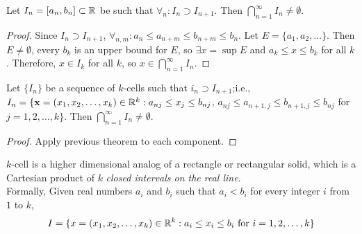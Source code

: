 \begin{thm}[38]
	Let $I_n = [a_n,b_n] \subset \mathbb{R} $ be such that $\forall_{n}: I_n \supset I_{n+1}$. Then $\bigcap_{n=1}^{\infty}I_n \neq \emptyset$.
	\begin{proof}
		Since $I_n \supset I_{n+1}$, $\forall_{n,m}: a_n \le a_{n+m} \le b_{n+m} \le b_n$.
		Let $E=\{a_1,a_2,\ldots \} $. Then $E \neq \emptyset $, every $b_k$ is an upper bound for $E$, so $\exists x= \sup{E}$ and $a_k \le x \le b_k$ for all $k$.
		Therefore, $x \in I_k$ for all $k$, so $x \in \bigcap_{n=1}^{\infty}I_n$.
	\end{proof}
\end{thm}

\begin{thm}[39]
	Let $\{I_n\} $ be a sequence of $k$-cells such that $i_n \supset I_{n+1}$;i.e.,
	$I_n=\{\mathbf{x}=(x_1,x_2, \ldots ,x_k) \in \mathbb{R}^{k}: a_{nj}\le x_j \le b_{nj}$, $a_{nj} \le a_{n+1,j} \le b_{n+1,j} \le b_{nj}$ for $j=1,2,\ldots ,k\}$.
	Then $\bigcap_{n=1}^{\infty}I_n \neq \emptyset$.
	\begin{proof}
		Apply previous theorem to each component.
	\end{proof}
	\begin{note}
		$k$-cell is a higher dimensional analog of a rectangle or rectangular solid, which is a Cartesian product of $k$ \textit{closed intervals on the real line}.\\
		Formally,
		Given real numbers $a_{i}$ and $b_{i}$ such that $a_{i} < b_{i}$ for every integer $i$ from $1$ to $k$,
		\[
			I=\{x=(x_1,x_2, \ldots ,x_k) \in \mathbb{R}^{k}: a_i \le x_i \le b_i \text{ for } i=1,2,\ldots ,k\}
		\]
	\end{note}
\end{thm}

